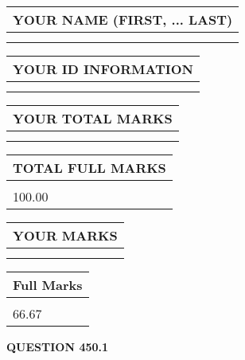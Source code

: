 \documentclass{ctexart}
\begin{document}
   
   
   
\newpage 
\setcounter{page}{ 
   450001 } 
   
   
   
   
\noindent\begin{tabular}{|l|}
\hline
YOUR NAME (FIRST, ... LAST)  \\
\hline
 \\ 
 \\ 
\hline
\end{tabular}
\hspace{0.05in} \begin{tabular}{|l|}
\hline
 YOUR   ID   INFORMATION  \\
\hline
 \\ 
 \\ 
\hline
\end{tabular}
   
   
\vspace{0.2in}\noindent\begin{tabular}{|l|}
\hline
YOUR TOTAL MARKS  \\
\hline
 \\ 
 \\ 
\hline
\end{tabular}
\hspace{0.05in} \begin{tabular}{|l|}
\hline
TOTAL FULL MARKS  \\
\hline
 \\ 
100.00 \\
\hline
\end{tabular}
   
   
 \vspace{0.2in}
 
 
 
 
   
   
  
\vspace{0.2in}
  
\noindent\begin{tabular}{|l|}
\hline
 YOUR MARKS  \\
\hline
 \\ 
 \\ 
\hline
\end{tabular}
\hspace{0.05in} \begin{tabular}{|l|}
\hline
 Full Marks  \\
\hline
 \\ 
66.67 \\
\hline
\end{tabular}
{\textbf{\Large{QUESTION
450.1 
}}}
  
\end{document}

